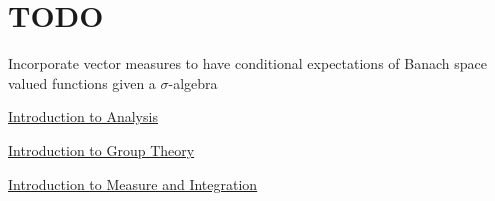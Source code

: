 \documentclass[12pt]{amsart}
\theoremstyle{definition}
\newcommand{\sig}{\sigma}
\begin{document}
	\newpage
		\section{TODO}
	Incorporate vector measures to have conditional expectations of Banach space valued functions given a $\sig$-algebra
	

	
	
	
	
	
	\newpage
	\begin{thebibliography}{4}
  \href{https://github.com/carsonaj/Mathematics/blob/master/Introduction\%20to\%20Analysis/Introduction\%20to\%20Analysis.pdf}{Introduction to Analysis}	
	
 \href{https://github.com/carsonaj/Mathematics/tree/master/Introduction\%20to\%20Group\%20Theory}{Introduction to Group Theory}

  \href{https://github.com/carsonaj/Mathematics/blob/master/Introduction\%20to\%20Measure\%20and\%20Integration/Introduction\%20to\%20Measure\%20and\%20Integration.pdf}{Introduction to Measure and Integration}


\end{thebibliography}
	
	
\end{document}
